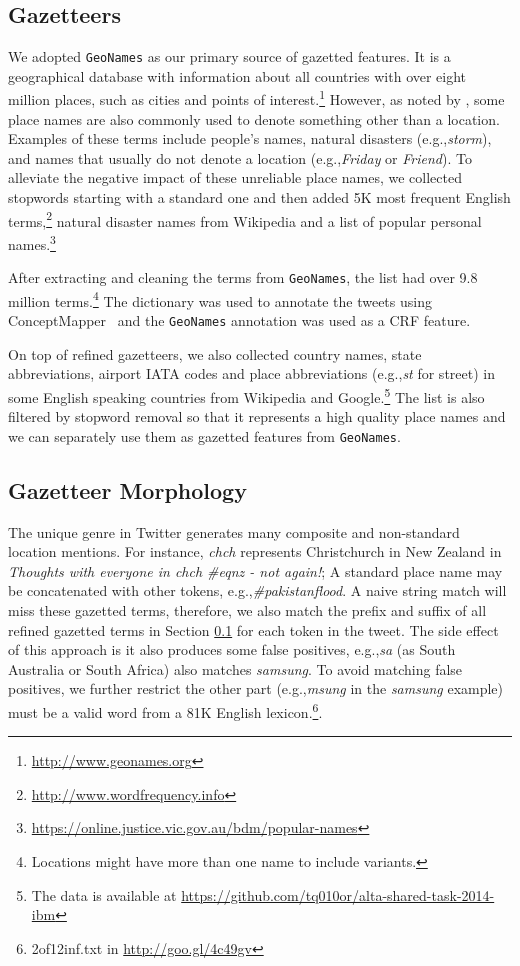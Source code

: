 \documentclass[11pt]{article}
\newcommand{\eg}{e.g.,\xspace}
\newcommand{\geoname}{\texttt{GeoNames}\xspace}
\newcommand{\myex}[1]{\textit{#1}}
\newcommand{\myurl}[1]{{\footnotesize\url{#1}}}
\newcommand{\secref}[2][]{Section#1 \ref{#2}}
\begin{document}
\subsection{Gazetteers}
\label{sec:gaze_feature}

We adopted \geoname as our primary source of gazetted features.
It is a geographical database with information about all countries with over eight million places, such as cities and points of interest.\footnote{\myurl{http://www.geonames.org}} 
However, as noted by , some place names are also commonly used to denote something other than a location.
Examples of these terms include people's names, natural disasters (\eg \myex{storm}), and names that usually do not denote a location (\eg \myex{Friday} or \myex{Friend}).
To alleviate the negative impact of these unreliable place names, we collected stopwords starting with a standard one and then added 5K most frequent English terms,\footnote{\myurl{http://www.wordfrequency.info}} natural disaster names from Wikipedia and a list of popular personal names.\footnote{\myurl{https://online.justice.vic.gov.au/bdm/popular-names}}

After extracting and cleaning the terms from \geoname, the list had over 9.8 million terms.\footnote{Locations might have more than one name to include variants.}
The dictionary was used to annotate the tweets using ConceptMapper~\cite{tanenblatt2010conceptmapper} and the \geoname annotation was used as a CRF feature.

On top of refined gazetteers, we also collected country names, state abbreviations, airport IATA codes and place abbreviations (\eg \myex{st} for street) in some English speaking countries from Wikipedia and Google.\footnote{The data is available at \myurl{https://github.com/tq010or/alta-shared-task-2014-ibm}}
The list is also filtered by stopword removal so that it represents a high quality place names and we can separately use them as gazetted features from \geoname.

\subsection{Gazetteer Morphology}
\label{sec:mor_feature}

The unique genre in Twitter generates many composite and non-standard location mentions.
For instance, \myex{chch} represents Christchurch in New Zealand in \myex{Thoughts with everyone in chch \#eqnz - not again!}; 
A standard place name may be concatenated with other tokens, \eg \myex{\#pakistanflood}.
A naive string match will miss these gazetted terms, therefore, we also match the prefix and suffix of all refined gazetted terms in \secref{sec:gaze_feature} for each token in the tweet.
The side effect of this approach is it also produces some false positives, \eg \myex{sa} (as South Australia or South Africa) also matches \myex{samsung}.
To avoid matching false positives, we further restrict the other part (\eg \myex{msung} in the \myex{samsung} example) must be a valid word from a 81K English lexicon.\footnote{2of12inf.txt in \myurl{http://goo.gl/4c49gv}}.
\end{document}
